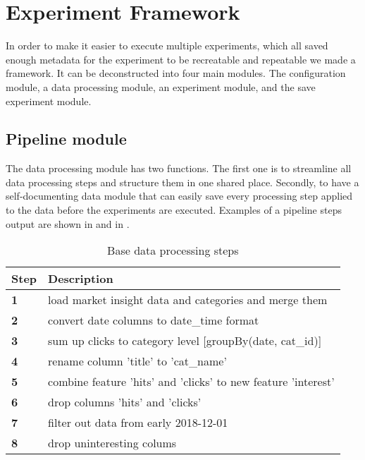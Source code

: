\section{Experiment Framework}
\label{section:method:experiment-framework}
In order to make it easier to execute multiple experiments, which all saved
enough metadata for the experiment to be recreatable and repeatable we made
a framework. It can be deconstructed into
four main modules. The configuration module, a data processing module, an experiment module, and the save experiment module.


\subsection{Pipeline module}
\label{section:Method:Pipeline}
The data processing module has two functions.
The first one is to streamline all data processing steps and structure them in one shared place.
Secondly, to have a self-documenting data module that can easily save
every processing step applied to the data before the experiments are executed.
Examples of a pipeline steps output are shown in 
and in .

\begin{table}[h]
  \caption{Base data processing steps}
  \label{table:base_data_processing_steps}
  \begin{tabular}{ll}
    \toprule
    Step       & Description                                                   \\
    \midrule
    \textbf{1} & load market insight data and categories and merge them        \\
    \textbf{2} & convert date columns to date\_time format                     \\
    \textbf{3} & sum up clicks to category level [groupBy(date, cat\_id)]      \\
    \textbf{4} & rename column 'title' to 'cat\_name'                          \\
    \textbf{5} & combine feature 'hits' and 'clicks' to new feature 'interest' \\
    \textbf{6} & drop columns 'hits' and 'clicks'                              \\
    \textbf{7} & filter out data from early 2018-12-01                         \\
    \textbf{8} & drop uninteresting colums                                     \\
    \bottomrule
  \end{tabular}
\end{table}

